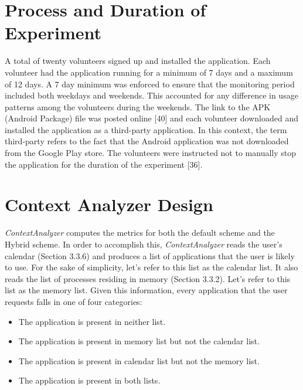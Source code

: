 \documentclass[12pt]{uthesis-v12}  %
\begin{document}
	\section{Process and Duration of Experiment}
		A total of twenty volunteers signed up and installed the application. Each volunteer had the application running for a minimum of 7 days and a maximum of 12 days. A 7 day minimum was enforced to ensure that the monitoring period included both weekdays and weekends. This accounted for any difference in usage patterns among the volunteers during the weekends. The link to the APK (Android Package) file was posted online [40] and each volunteer downloaded and installed the application as a third-party application. In this context, the term third-party refers to the fact that the Android application was not downloaded from the Google Play store. The volunteers were instructed not to manually stop the application for the duration of the experiment [36].
		 		 
	\section{Context Analyzer Design}
		{\em ContextAnalyzer} computes the metrics for both the default scheme and the Hybrid scheme. In order to  accomplish this, {\em ContextAnalyzer} reads the user's calendar (Section 3.3.6) and produces a list of applications that the user is likely to use. For the sake of simplicity, let's refer to this list as the calendar list. It also reads the list of processes residing in memory (Section 3.3.2). Let's refer to this list as the memory list. Given this information, every application that the user requests falls in one of four categories:
		
		\begin{itemize}
			\item The application is present in neither list.
			\item The application is present in memory list but not the calendar list.
			\item The application is present in calendar list but not the memory list.
			\item The application is present in both lists. 
		\end{itemize}  
		
\end{document}
